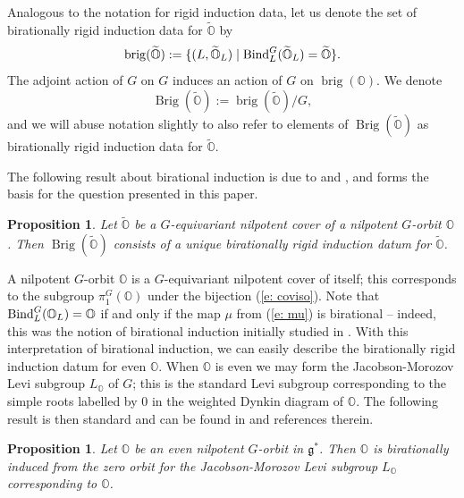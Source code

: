\documentclass[11pt]{amsart}
\renewcommand{\O}{{\mathbb O}}
\newcommand{\g}{{\mathfrak g}}
\newcommand{\brig}{\operatorname{brig}}
\newcommand{\Brig}{\operatorname{Brig}}
\newcommand{\BInd}{{{\mbox{\rm Bind}}}}
\newcommand{\covO}{\widetilde{\O}}
\newtheorem{prop}[theorem]{Proposition}
\numberwithin{equation}{section}
\begin{document}
	Analogous to the notation for rigid induction data, let us denote the set of birationally rigid induction data for $\covO$ by $$\brig(\covO):=\{(L,\covO_L)\mid \BInd_L^G(\covO_L)=\covO\}.$$ The adjoint action of $G$ on $G$ induces an action of $G$ on $\brig(\O)$. We denote $$\Brig(\covO):=\brig(\covO)/ G,$$ and we will abuse notation slightly to also refer to elements of $\Brig(\covO)$ as birationally rigid induction data for $\covO$.
	
	The following result about birational induction is due to \cite[Theorem 4.4]{LoOM} and \cite[Proposition 2.4.1]{LMM}, and forms the basis for the question presented in this paper.
	\begin{prop}\label{p: uniq brid}
		Let $\covO$ be a $G$-equivariant nilpotent cover of a nilpotent $G$-orbit $\O$. Then $\Brig(\covO)$ consists of a unique birationally rigid induction datum for $\covO$.
	\end{prop}
	
	A nilpotent $G$-orbit $\O$ is a $G$-equivariant nilpotent cover of itself; this corresponds to the subgroup $\pi_1^G(\O)$ under the bijection (\ref{e: coviso}). Note that $\BInd_L^G(\O_L)=\O$ if and only if the map $\mu$ from (\ref{e: mu}) is birational -- indeed, this was the notion of birational induction initially studied in \cite{LoOM}. With this interpretation of birational induction, we can easily describe the birationally rigid induction datum for even $\O$. When $\O$ is even we may form the Jacobson-Morozov Levi subgroup $L_{\O}$ of $G$; this is the standard Levi subgroup corresponding to the simple roots labelled by 0 in the weighted Dynkin diagram of $\O$. The following result is then standard and can be found in \cite[\S2.4]{LMM} and references therein.
	
	
	\begin{prop}\label{p: even}
		Let $\O$ be an even nilpotent $G$-orbit in $\g^{*}$. Then $\O$ is birationally induced from the zero orbit for the Jacobson-Morozov Levi subgroup $L_\O$ corresponding to $\O$.
	\end{prop}
	
\end{document}
